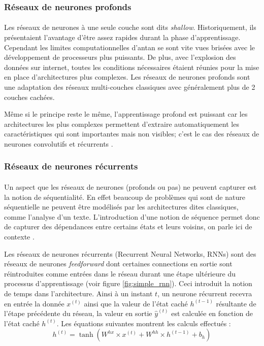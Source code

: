 \subsubsection{Réseaux de neurones profonds}\label{part2DNN}
\paragraph{}
Les réseaux de neurones à une seule couche sont dits \textit{shallow}. Historiquement, ils présentaient l'avantage d'être assez rapides durant la phase d'apprentissage. Cependant les limites computationnelles d'antan se sont vite vues brisées avec le développement de processeurs plus puissants. De plus, avec l'explosion des données sur internet, toutes les conditions nécessaires étaient réunies pour la mise en place d'architectures plus complexes. Les réseaux de neurones profonds sont une adaptation des réseaux multi-couches classiques avec généralement plus de 2 couches cachées. 
\par 
Même si le principe reste le même, l'apprentissage profond est puissant car les architectures les plus complexes permettent d'extraire automatiquement les caractéristiques qui sont importantes mais non visibles; c'est le cas des réseaux de neurones convolutifs et récurrents \citep{dnn}.

\subsubsection{Réseaux de neurones récurrents}\label{seq2seqpart2}
\paragraph{}
Un aspect que les réseaux de neurones (profonds ou pas) ne peuvent capturer est la notion de séquentialité. En effet beaucoup de problèmes qui sont de nature séquentielle ne peuvent être modélisés par les architectures dites classiques, comme l'analyse d'un texte. L'introduction d'une notion de séquence permet donc de capturer des dépendances entre certains états et leurs voisins, on parle ici de contexte \citep{rnn_lstms}.
\par 
Les réseaux de neurones récurrents (Recurrent Neural Networks, RNNs) sont des réseaux de neurones \textit{feedforward} dont certaines connections en sortie sont réintroduites comme entrées dans le réseau durant une étape ultérieure du processus d'apprentissage (voir figure \ref{fig:simple_rnn}). Ceci introduit la notion de temps dans l'architecture. Ainsi à un instant $t$, un neurone récurrent recevra en entrée la donnée $x^{(t)}$ ainsi que la valeur de l'état caché $h^{(t-1)}$ résultante de l'étape précédente du réseau, la valeur en sortie $\hat{y}^{(t)}$ est calculée en fonction de l'état caché $h^{(t)}$. Les équations suivantes montrent les calculs effectués \citep{rnn_lstms} :
\begin{equation}
h^{(t)} = \tanh(W^{hx} \times x^{(t)} + W^{hh} \times h^{(t-1)} + b_h)
\end{equation}

